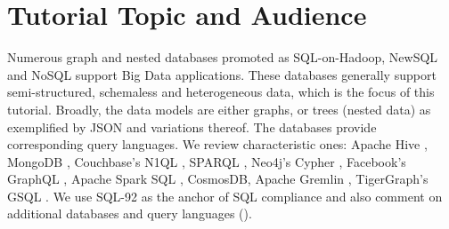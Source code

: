 
\section{Tutorial Topic and Audience}
Numerous graph and nested databases promoted as SQL-on-Hadoop, NewSQL and NoSQL support Big Data applications. These databases generally support semi-structured, schemaless and heterogeneous data, which is the focus of this tutorial. Broadly, the data models are either graphs, or trees (nested data) as exemplified by JSON and variations thereof. The databases provide corresponding query languages. We review characteristic ones: Apache Hive \cite{hive-icde-2010},  MongoDB \cite{mongodb}, Couchbase's N1QL \cite{couchbase,couchbase-sigmod-2016}, SPARQL \cite{sparql}, Neo4j's Cypher \cite{cypher}, Facebook's GraphQL \cite{graphql}, Apache Spark SQL \cite{sparksql}, CosmosDB, Apache Gremlin \cite{gremlin}, TigerGraph's GSQL \cite{gsql}. We use SQL-92 as the anchor of SQL compliance and also comment on additional databases and query languages (\cite{impala,cosmosdb,bigquery,jaql-pvldb-2011,jsoniq-ieee-ic-2013,asterixdb-dpd-2011-all-authors}).


